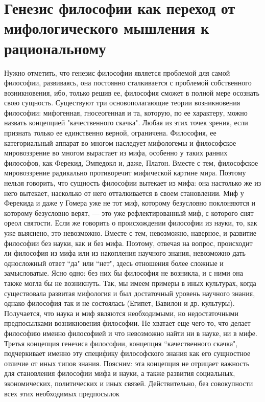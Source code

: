 \documentclass[12pt]{article}
\begin{document}
\section{Генезис философии как переход от мифологического мышления к рациональному}
Нужно отметить, что генезис философии является проблемой для самой философии, развиваясь, она постоянно
сталкивается с проблемой собственного возникновения, ибо, только решив ее, философия сможет в полной мере
осознать свою сущность. 
Существуют  три  основополагающие  теории  возникновения  философии:  мифогенная,  гносеогенная  и  та,
которую, по ее характеру, можно назвать концепцией "качественного скачка". Любая из этих точек зрения, если
признать  только  ее  единственно  верной,  ограничена.  Философия,  ее  категориальный  аппарат  во  многом
наследует мифологемы и философское мировоззрение во многом вырастает из мифа, особенно у таких ранних
философов, как Ферекид, Эмпедокл и, даже, Платон. Вместе с тем, философское мировоззрение радикально
противоречит мифической картине мира. Поэтому нельзя говорить, что сущность философии вытекает из мифа:
она настолько же из него вытекает, насколько от него отталкивается в своем становлении. Миф у Ферекида и
даже у Гомера уже не тот миф, которому безусловно поклоняются и которому безусловно верят, --- это уже
рефлектированный миф, с которого снят ореол святости. 
Если же говорить о происхождении философии из науки, то, как уже выяснено, это невозможно. Вместе с тем,
невозможно, наверное, и развитие философии без науки, как и без мифа. Поэтому, отвечая на вопрос,
происходит ли философия из мифа или из накопления научного знания, невозможно дать односложный ответ
``да" или ``нет", здесь отношения более сложные и замысловатые.
Ясно одно: без них бы философия не возникла,
и с ними она также могла бы не возникнуть. Так, мы имеем примеры в иных культурах, когда существовала
развитая  мифология  и  был достаточный  уровень научного знания, однако  философия  так и не  состоялась
(Египет, Вавилон и др. культуры). Получается, что наука и миф являются необходимыми, но недостаточными
предпосылками возникновения философии. Не хватает еще чего-то, что делает философию именно философией
и что невозможно найти ни в науке, ни в мифе. 
Третья концепция генезиса философии, концепция ``качественного скачка", подчеркивает именно эту специфику
философского знания как его сущностное отличие от иных типов знания. Поясним: эта концепция не отрицает
важность  для  становления  философии  мифа  и  науки,  а  также  развития  социальных,  экономических,
политических  и  иных  связей.  Действительно,  без  совокупности  всех  этих  необходимых  предпосылок
\end{document}
